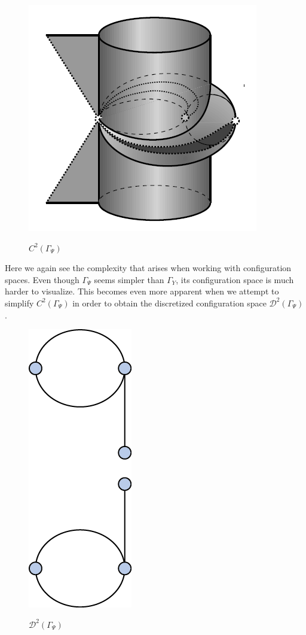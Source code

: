 \documentclass[12pt,oneside]{amsbook}
\newcommand{\Y}{\Gamma_Y}
\begin{document}
\begin{figure}[h]
\centering
\caption{$C^2(\Gamma_{\Psi})$\cite{factory}}
\includegraphics[scale=.5]{Bad_C.png}
\label{fig:C_Psi}
\end{figure}

Here we again see the complexity that arises when working with configuration spaces. Even though $\Gamma_{\Psi}$ seems simpler than $\Y$, its configuration space is much harder to visualize. This becomes even more apparent when we attempt to simplify $C^2(\Gamma_{\Psi})$ in order to obtain the discretized configuration space $\mathcal{D}^2(\Gamma_{\Psi})$. 

\begin{figure}[h]
\centering
\caption{$\mathcal{D}^2(\Gamma_{\Psi})$}
\includegraphics[scale=.5]{Bad_D.png}
\label{fig:D_Psi}
\end{figure}
\end{document}
